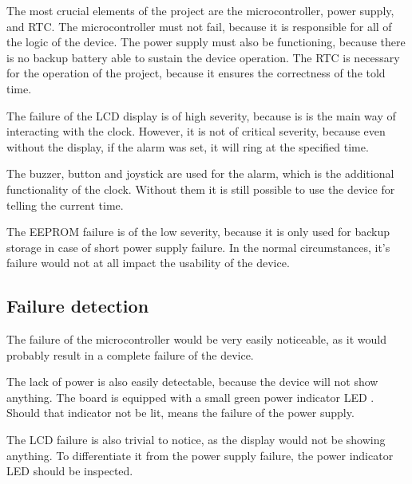 \documentclass[10pt]{article}
\begin{document}
    The most crucial elements of the project are the microcontroller, power supply, and RTC.
    The microcontroller must not fail, because it is responsible for all of the logic of the device.
    The power supply must also be functioning, because there is no backup battery able to sustain the device operation.
    The RTC is necessary for the operation of the project, because it ensures the correctness of the told time.

    The failure of the LCD display is of high severity, because is is the main way of interacting with the clock.
    However, it is not of critical severity, because even without the display, if the alarm was set, it will ring at the specified time.

    The buzzer, button and joystick are used for the alarm, which is the additional functionality of the clock.
    Without them it is still possible to use the device for telling the current time.

    The EEPROM failure is of the low severity, because it is only used for backup storage in case of short power supply failure.
    In the normal circumstances, it's failure would not at all impact the usability of the device.

    \subsection{Failure detection}

    The failure of the microcontroller would be very easily noticeable, as it would probably result in a complete failure of the device.
    
    The lack of power is also easily detectable, because the device will not show anything.
    The board is equipped with a small green power indicator LED \cite{eduboard-man}. 
    Should that indicator not be lit, means the failure of the power supply.

    The LCD failure is also trivial to notice, as the display would not be showing anything.
    To differentiate it from the power supply failure, the power indicator LED should be inspected.

    \nocite{*}
    
    
\end{document}
